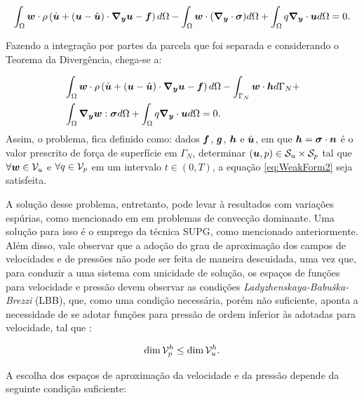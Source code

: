 \begin{equation}
    \int_{\Omega}{\boldsymbol{w}\cdot\rho\left({\dot{\boldsymbol{u}}+(\boldsymbol{u}-\hat{\boldsymbol{u}})\cdot\boldsymbol{\nabla_y}\boldsymbol{u}-\boldsymbol{f}}\right) d\Omega}-\int_{\Omega}{\boldsymbol{w}\cdot(\boldsymbol{\nabla_y}\cdot\boldsymbol{\sigma}) d\Omega}+\int_{\Omega}{q\boldsymbol{\nabla_y}\cdot\boldsymbol{u} d\Omega}=0\text{.}
    \label{eq:WeakForm1}
\end{equation}

Fazendo a integração por partes da parcela que foi separada e considerando o Teorema da Divergência, chega-se a:

\begin{equation}
    \begin{split}
        &\int_{\Omega}{\boldsymbol{w}\cdot\rho\left({\dot{\boldsymbol{u}}+(\boldsymbol{u}-\hat{\boldsymbol{u}})\cdot\boldsymbol{\nabla_y}\boldsymbol{u}-\boldsymbol{f}}\right) d\Omega}-\int_{\Gamma_N}{\boldsymbol{w}\cdot\boldsymbol{h} d\Gamma_N}+\\
        &\int_{\Omega}{\boldsymbol{\nabla_y}\boldsymbol{w}:\boldsymbol{\sigma} d\Omega}+\int_{\Omega}{q\boldsymbol{\nabla_y}\cdot\boldsymbol{u} d\Omega}=0\text{.}
    \end{split}
    \label{eq:WeakForm2}
\end{equation}
Assim, o problema, fica definido como: dados $\boldsymbol{f}$, $\boldsymbol{g}$, $\boldsymbol{h}$ e $\hat{\boldsymbol{u}}$, em que $\boldsymbol{h}=\boldsymbol{\sigma}\cdot\boldsymbol{n}$ é o valor prescrito de força de superfície em $\Gamma_N$, determinar $(\boldsymbol{u},p)\in\mathcal{S}_u\times\mathcal{S}_p$ tal que $\forall\boldsymbol{w}\in\mathcal{V}_u$ e $\forall q\in\mathcal{V}_p$ em um intervalo $t\in(0,T)$, a equação \eqref{eq:WeakForm2} seja satisfeita.

A solução desse problema, entretanto, pode levar à resultados com variações espúrias, como mencionado em \cite{fernandes2020tecnica,donea2003finite,brooks1982streamline} em problemas de convecção dominante. Uma solução para isso é o emprego da técnica SUPG, como mencionado anteriormente. Além disso, vale observar que a adoção do grau de aproximação dos campos de velocidades e de pressões não pode ser feita de maneira descuidada, uma vez que, para conduzir a uma sistema com unicidade de solução, os espaços de funções para velocidade e pressão devem observar as condições \textit{Ladyzhenskaya-Babuška-Brezzi} (LBB), que, como uma condição necessária, porém não suficiente, aponta a necessidade de se adotar funções para pressão de ordem inferior às adotadas para velocidade, tal que \cite{donea2003finite}:

\begin{equation}
    \dim{\mathcal{V}_p^h}\leq\dim{\mathcal{V}_u^h}\text{.}
\end{equation}

A escolha dos espaços de aproximação da velocidade e da pressão depende da seguinte condição suficiente:

